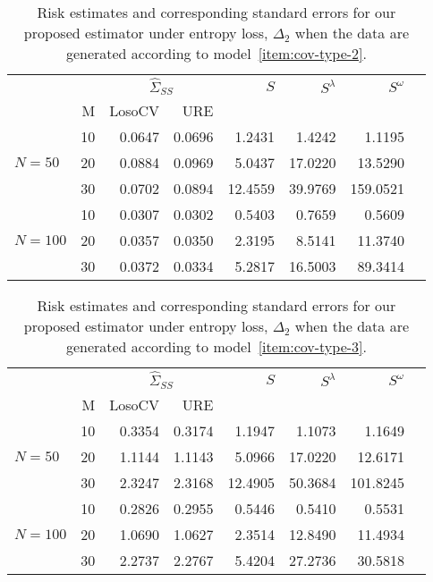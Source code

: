 \documentclass[12pt]{article}
\theoremstyle{definition}
\begin{document}

\begin{table}[H] \label{table:simulation-1-entropy-loss-sigma-2}
\centering
\caption{Risk estimates and corresponding standard errors for our proposed estimator under entropy loss, $\Delta_2$ when the data are generated according to model~\ref{item:cov-type-2}.} \begin{tabular}{l|r|rrrrrr}
&  & \multicolumn{2}{c}{$\hat{\Sigma}_{SS}$} & $S$ & $S^\lambda$ & $S^\omega$ \\ 
&M & \mbox{LosoCV} & \mbox{URE} &  \\ 
  \hline
 &    10 & 0.0647 & 0.0696	 & 1.2431 & 1.4242 & 1.1195\\ 
$N = 50$ &    20 & 0.0884 & 0.0969 & 5.0437 & 17.0220 & 13.5290\\ 
&    30 & 0.0702 & 0.0894 & 12.4559 & 39.9769 & 159.0521 \\ 
   \hdashline
&    10 & 0.0307 & 0.0302 & 0.5403& 0.7659 & 0.5609 \\ 
$N = 100 $ &    20 & 0.0357 & 0.0350  & 2.3195 & 8.5141 & 11.3740 \\ 
   &    30 & 0.0372 & 0.0334 & 5.2817& 16.5003 & 89.3414  \\ 
\end{tabular}
\end{table}


\begin{table}[H] \label{table:simulation-1-entropy-loss-sigma-3}
\centering
\caption{Risk estimates and corresponding standard errors for our proposed estimator under entropy loss, $\Delta_2$ when the data are generated according to model~\ref{item:cov-type-3}.} 
\begin{tabular}{l|r|rrrrrr}
&  & \multicolumn{2}{c}{$\hat{\Sigma}_{SS}$} & $S$ & $S^\lambda$ & $S^\omega$ \\ 
&M & \mbox{LosoCV} & \mbox{URE} &  \\  
&    10 & 0.3354 &	0.3174	&  1.1947  & 1.1073 & 1.1649\\ 
$N = 50$ &    20 & 1.1144 &	1.1143	&  5.0966&17.0220 & 12.6171 \\ 
  &    30 & 2.3247 & 	2.3168	&  12.4905 & 50.3684 & 101.8245\\ 
   \hdashline
    &    10 & 0.2826 & 0.2955  & 0.5446& 0.5410 & 0.5531  \\ 
  $N = 100$ &    20 & 1.0690 &  1.0627 & 2.3514 & 12.8490 & 11.4934\\ 
   &    30 & 2.2737 & 2.2767 & 5.4204& 27.2736 & 30.5818  \\ 
\end{tabular}
\end{table}
\end{document}
